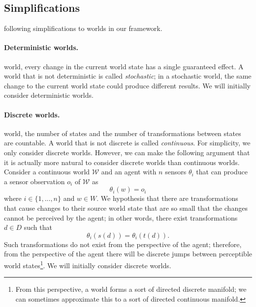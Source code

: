\subsection{Simplifications}

 following simplifications to worlds in our framework.


\paragraph{Deterministic worlds.}
 world, every change in the current world state has a single guaranteed effect.
A world that is not deterministic is called \emph{stochastic}; in a stochastic world, the same change to the current world state could produce different results.
We will initially consider deterministic worlds.


\paragraph{Discrete worlds.}
 world, the number of states and the number of transformations between states are countable.
A world that is not discrete is called \emph{continuous}.
For simplicity, we only consider discrete worlds.
However, we can make the following argument that it is actually more natural to consider discrete worlds than continuous worlds.
Consider a continuous world $\mathscr{W}$ and an agent with $n$ sensors $\theta_{i}$ that can produce a sensor observation $o_{i}$ of $\mathscr{W}$ as
\begin{equation}
	\theta_{i}(w) = o_{i}
\end{equation}
where $i \in \{1, ..., n\}$ and $w \in W$.
We hypothesis that there are transformations that cause changes to their source world state that are so small that the changes cannot be perceived by the agent; in other words, there exist transformations $d \in D$ such that
\begin{equation}
	\theta_{i}(s(d)) = \theta_{i}(t(d)).
\end{equation}
Such transformations do not exist from the perspective of the agent; therefore, from the perspective of the agent there will be discrete jumps between perceptible world states\footnote{
From this perspective, a world forms a sort of directed discrete manifold; we can sometimes approximate this to a sort of directed continuous manifold.
}.
We will initially consider discrete worlds.

